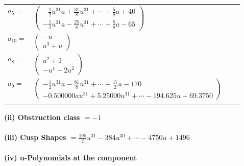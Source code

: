 \documentclass[1p]{elsarticle_modified}
\theoremstyle{definition}
\begin{document}
\begin{tabular}{m{7pt} m{180pt} m{7pt} m{180pt} }
\flushright $a_{5}=$&$\begin{pmatrix}-\frac{1}{2} u^{31} a+\frac{31}{8} u^{31}+\cdots+\frac{5}{8} a+40\\-\frac{1}{2} u^{31} a-\frac{25}{8} u^{31}+\cdots+\frac{5}{8} a-65\end{pmatrix}$ \\
\flushright $a_{10}=$&$\begin{pmatrix}- u\\u^3+u\end{pmatrix}$ \\
\flushright $a_{8}=$&$\begin{pmatrix}u^2+1\\- u^4-2 u^2\end{pmatrix}$ \\
\flushright $a_{9}=$&$\begin{pmatrix}-\frac{1}{2} u^{31} a-\frac{81}{8} u^{31}+\cdots+\frac{17}{2} a-170\\-0.500000 a u^{31}+5.25000 u^{31}+\cdots-194.625 u+69.3750\end{pmatrix}$\\&\end{tabular}
\flushleft \textbf{(ii) Obstruction class $= -1$}\\~\\
\flushleft \textbf{(iii) Cusp Shapes $= \frac{195}{2} u^{31}-384 u^{30}+\cdots-4750 u+1496$}\\~\\
\newpage\renewcommand{\arraystretch}{1}
\flushleft \textbf{(iv) u-Polynomials at the component}\newline \\
\end{document}
